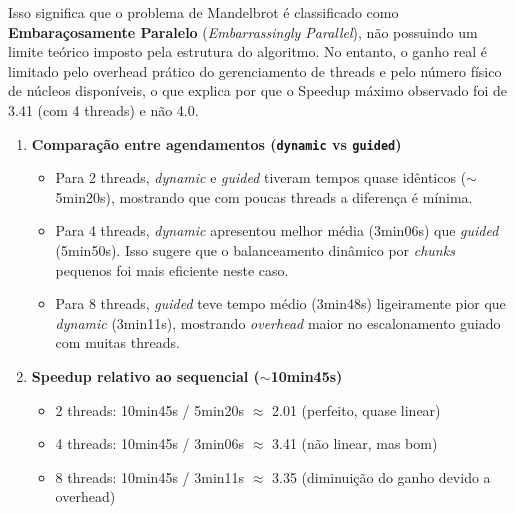 \documentclass[12pt]{article}
\begin{document}
Isso significa que o problema de Mandelbrot é classificado como \textbf{Embaraçosamente Paralelo} (\textit{Embarrassingly Parallel}), não possuindo um limite teórico imposto pela estrutura do algoritmo. No entanto, o ganho real é limitado pelo overhead prático do gerenciamento de threads e pelo número físico de núcleos disponíveis, o que explica por que o Speedup máximo observado foi de 3.41 (com 4 threads) e não 4.0.

\begin{enumerate}

    \item \textbf{Comparação entre agendamentos (\texttt{dynamic} vs \texttt{guided})}
    \vspace{0.5em} %
    \begin{itemize}
        \item Para 2 threads, \textit{dynamic} e \textit{guided} tiveram tempos quase idênticos ($\sim$5min20s), mostrando que com poucas threads a diferença é mínima.
        \item Para 4 threads, \textit{dynamic} apresentou melhor média (3min06s) que \textit{guided} (5min50s). Isso sugere que o balanceamento dinâmico por \textit{chunks} pequenos foi mais eficiente neste caso.
        \item Para 8 threads, \textit{guided} teve tempo médio (3min48s) ligeiramente pior que \textit{dynamic} (3min11s), mostrando \textit{overhead} maior no escalonamento guiado com muitas threads.
    \end{itemize}
    \vspace{0.5em}

    \item \textbf{Speedup relativo ao sequencial ($\sim$10min45s)}

    \vspace{0.5em} 
    \begin{itemize}
        \item 2 threads: 10min45s / 5min20s $\approx$ 2.01 (perfeito, quase linear)
        \item 4 threads: 10min45s / 3min06s $\approx$ 3.41 (não linear, mas bom)
        \item 8 threads: 10min45s / 3min11s $\approx$ 3.35 (diminuição do ganho devido a overhead)
    \end{itemize}

\end{enumerate}
\end{document}

